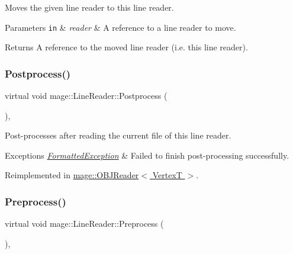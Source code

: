 Moves the given line reader to this line reader.


\begin{DoxyParams}[1]{Parameters}
\mbox{\tt in}  & {\em reader} & A reference to a line reader to move. \\
\hline
\end{DoxyParams}
\begin{DoxyReturn}{Returns}
A reference to the moved line reader (i.\+e. this line reader). 
\end{DoxyReturn}
\hypertarget{classmage_1_1_line_reader_adfde21013140a1058d3dd567204abfb5}{}\label{classmage_1_1_line_reader_adfde21013140a1058d3dd567204abfb5} 
\subsubsection{\texorpdfstring{Postprocess()}{Postprocess()}}
{\footnotesize\ttfamily virtual void mage\+::\+Line\+Reader\+::\+Postprocess (\begin{DoxyParamCaption}{ }\end{DoxyParamCaption})\hspace{0.3cm}{\ttfamily [private]}, {\ttfamily [virtual]}}

Post-\/processes after reading the current file of this line reader.


\begin{DoxyExceptions}{Exceptions}
{\em \hyperlink{classmage_1_1_formatted_exception}{Formatted\+Exception}} & Failed to finish post-\/processing successfully. \\
\hline
\end{DoxyExceptions}


Reimplemented in \hyperlink{classmage_1_1_o_b_j_reader_a248977c8300575ed2bab04df26197919}{mage\+::\+O\+B\+J\+Reader$<$ Vertex\+T $>$}.

\hypertarget{classmage_1_1_line_reader_a4de135cfb0434be786cfcfd7959031ef}{}\label{classmage_1_1_line_reader_a4de135cfb0434be786cfcfd7959031ef} 
\subsubsection{\texorpdfstring{Preprocess()}{Preprocess()}}
{\footnotesize\ttfamily virtual void mage\+::\+Line\+Reader\+::\+Preprocess (\begin{DoxyParamCaption}{ }\end{DoxyParamCaption})\hspace{0.3cm}{\ttfamily [private]}, {\ttfamily [virtual]}}

